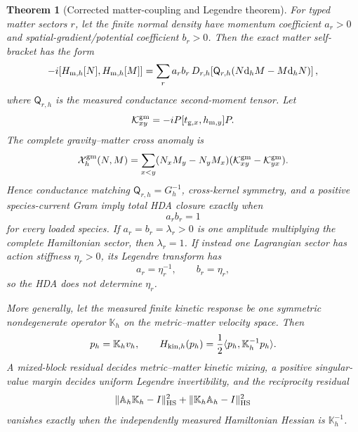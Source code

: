 \documentclass[11pt]{article}
\newtheorem{theorem}{Theorem}[section]
\theoremstyle{definition}
\theoremstyle{remark}
\newcommand{\dd}{\mathrm d}
\begin{document}
\begin{theorem}[Corrected matter-coupling and Legendre theorem]
\label{thm:master-matter-Legendre-v036}
For typed matter sectors \(r\), let the finite normal density have momentum
coefficient \(a_r>0\) and spatial-gradient/potential coefficient \(b_r>0\).
Then the exact matter self-bracket has the form
\[
 -i[H_{{\rm m},h}[N],H_{{\rm m},h}[M]]
 =\sum_r a_rb_r\,D_{r,h}
 \!\left[\mathsf Q_{r,h}(N\dd_hM-M\dd_hN)\right],
\]
where \(\mathsf Q_{r,h}\) is the measured conductance second-moment tensor.
Let
\[
 \mathcal K_{xy}^{\rm gm}
 =-iP[t_{{\rm g},x},h_{{\rm m},y}]P.
\]
The complete gravity--matter cross anomaly is
\[
 \mathcal X_h^{\rm gm}(N,M)
 =\sum_{x<y}(N_xM_y-N_yM_x)
   (\mathcal K_{xy}^{\rm gm}-\mathcal K_{yx}^{\rm gm}).
\]
Hence conductance matching \(\mathsf Q_{r,h}=G_h^{-1}\), cross-kernel
symmetry, and a positive species-current Gram imply total HDA closure exactly
when
\[
 \boxed{a_rb_r=1}
\]
for every loaded species.  If \(a_r=b_r=\lambda_r>0\) is one amplitude
multiplying the complete Hamiltonian sector, then \(\lambda_r=1\).  If instead
one Lagrangian sector has action stiffness \(\eta_r>0\), its Legendre transform
has
\[
 a_r=\eta_r^{-1},\qquad b_r=\eta_r,
\]
so the HDA does not determine \(\eta_r\).

More generally, let the measured finite kinetic response be one symmetric
nondegenerate operator \(\mathbb K_h\) on the metric--matter velocity space.
Then
\[
 p_h=\mathbb K_hv_h,
 \qquad
 H_{{\rm kin},h}(p_h)=\frac12\langle p_h,\mathbb K_h^{-1}p_h\rangle.
\]
A mixed-block residual decides metric--matter kinetic mixing, a positive
singular-value margin decides uniform Legendre invertibility, and the
reciprocity residual
\[
 \|\mathbb A_h\mathbb K_h-I\|_{\rm HS}^2
 +\|\mathbb K_h\mathbb A_h-I\|_{\rm HS}^2
\]
vanishes exactly when the independently measured Hamiltonian Hessian is
\(\mathbb K_h^{-1}\).
\end{theorem}
\end{document}
